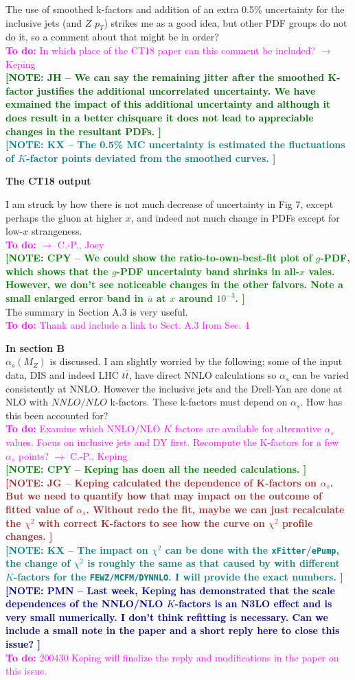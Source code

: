 \documentclass[aps,prd,amsmath,nofootinbib,floatfix,fleqn]{revtex4}
\newcommand{\TODO}[1]{\textcolor{magenta}{
\quad\vspace{3pt} \\ {\bf To do:} #1 \\
}}
\newcommand{\NOTECPY}[1]{\textcolor{green}{ \bf[NOTE: CPY -- #1 ]}}
\newcommand{\NOTEJH}[1]{\textcolor{darkgreen}{ \bf[NOTE: JH -- #1 ]}}
\newcommand{\NOTEPN}[1]{\textcolor{darkblue}{ \bf[NOTE: PMN -- #1 ]}}
\newcommand{\NOTEJG}[1]{\textcolor{brown}{ \bf[NOTE: JG -- #1 ]}}
\newcommand{\NOTEKX}[1]{\textcolor{teal}{ \bf[NOTE: KX -- #1 ]}}
\begin{document}
\noindent
The use of smoothed k-factors and addition of an extra 0.5\% uncertainty for the inclusive jets (and $Z$ $p_T$) strikes me as a good idea, but other PDF groups do not do it, so a comment about that might be in order?
\TODO{In which place of the CT18 paper can this comment be included? $\to$ Keping}
\NOTEJH{We can say the remaining jitter after the smoothed K-factor justifies the additional uncorrelated uncertainty. We have exmained the impact of this additional uncertainty and although it does result in a better chisquare it does not lead to appreciable changes in the resultant PDFs.}\\
\NOTEKX{The 0.5\% MC uncertainty is estimated the fluctuations of $K$-factor points deviated from the smoothed curves.}

{\bf The CT18 output}

I am struck by how there is not much decrease of uncertainty in Fig 7, except perhaps the gluon at higher $x$, and indeed not much change in PDFs except for low-$x$ strangeness.
\TODO{$\to$ C.-P., Joey}
\NOTECPY{We could show the ratio-to-own-best-fit plot of $g$-PDF, which shows that the $g$-PDF uncertainty band shrinks in all-$x$ vales. 
However, we don't see noticeable changes in the other falvors. Note a small enlarged error band in ${\bar u}$ at $x$ around $10^{-3}$.}\\


\noindent
The summary in Section A.3 is very useful.
\TODO{Thank and include a link to Sect. A.3 from Sec. 4}

\noindent
{\bf In section B}\\
 $\alpha_s(M_Z)$ is discussed. I am slightly worried by the following; some of the input data, DIS and indeed LHC $t\bar t$, have direct NNLO calculations so $\alpha_s$ can be varied consistently at NNLO. However the inclusive jets and the Drell-Yan are done at NLO with $NNLO/NLO$ k-factors. These k-factors must depend on $\alpha_s$. How has this been accounted for?
 \TODO{Examine which NNLO/NLO $K$ factors are available for alternative $\alpha_s$ values. Focus on inclusive jets and DY first. Recompute the K-factors for a few $\alpha_s$ points? $\to$ C.-P., Keping}
 \NOTECPY{Keping has doen all the needed calculations.}\\
 \NOTEJG{Keping calculated the dependence of K-factors on $\alpha_s$. But we need to quantify how that may impact on the outcome of fitted
 value of $\alpha_s$. Without redo the fit, maybe we can just recalculate the $\chi^2$ with correct K-factors to see how the curve on $\chi^2$ profile changes.}\\
 \NOTEKX{The impact on $\chi^2$ can be done with the \texttt{xFitter}/\texttt{ePump},  the change of $\chi^2$ is roughly the same as that caused by with different  $K$-factors for the \texttt{FEWZ/MCFM/DYNNLO}. I will provide the exact numbers.}
 \NOTEPN{Last week, Keping has demonstrated that the scale dependences of the NNLO/NLO $K$-factors is an N3LO effect and is very small numerically. I don't think refitting is necessary. Can we include a small note in the paper and a short reply here to close this issue?}
\TODO{200430 Keping will finalize the reply and modifications in the paper on this issue.}
\end{document}
